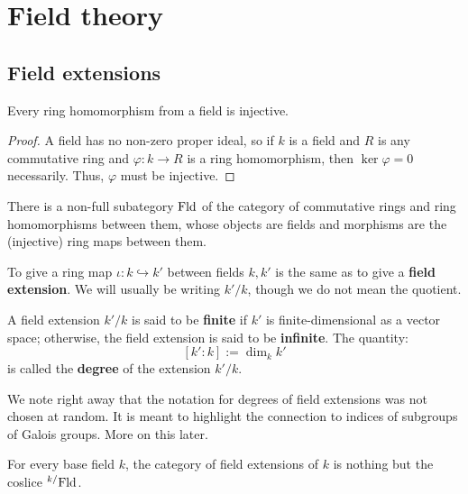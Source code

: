 \section{Field theory}
    \subsection{Field extensions}
        \begin{lemma} \label{lemma: ring_maps_from_fields_are_injective}
            Every ring homomorphism from a field is injective.
        \end{lemma}
            \begin{proof}
                A field has no non-zero proper ideal, so if $k$ is a field and $R$ is any commutative ring and $\varphi: k \to R$ is a ring homomorphism, then $\ker \varphi = 0$ necessarily. Thus, $\varphi$ must be injective.  
            \end{proof}
        \begin{corollary}
            There is a non-full subategory $\mathrm{Fld}$ of the category of commutative rings and ring homomorphisms between them, whose objects are fields and morphisms are the (injective) ring maps between them. 
        \end{corollary}

        \begin{definition} \label{def: field_extensions}
            To give a ring map $\iota: k \hookrightarrow k'$ between fields $k, k'$ is the same as to give a \textbf{field extension}. We will usually be writing $k'/k$, though we do not mean the quotient.
            
            A field extension $k'/k$ is said to be \textbf{finite} if $k'$ is finite-dimensional as a vector space; otherwise, the field extension is said to be \textbf{infinite}. The quantity:
                $$[k' : k] := \dim_k k'$$
            is called the \textbf{degree} of the extension $k'/k$.
        \end{definition}
        We note right away that the notation for degrees of field extensions was not chosen at random. It is meant to highlight the connection to indices of subgroups of Galois groups. More on this later.
        \begin{remark}
            For every base field $k$, the category of field extensions of $k$ is nothing but the coslice ${}^{k/}\mathrm{Fld}$.
        \end{remark}

